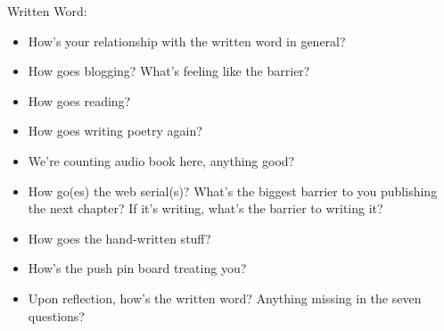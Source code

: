 
		\item Written Word:
		\begin{itemize}
			\item How's your relationship with the written word in general?

			\item How goes blogging? What's feeling like the barrier?

			\item How goes reading?

			\item How goes writing poetry again?

			\item We're counting audio book here, anything good?

			\item How go(es) the web serial(s)? What's the biggest barrier to you publishing the next chapter? If it's writing, what's the barrier to writing it?

			\item How goes the hand-written stuff?

			\item How's the push pin board treating you?

			\item Upon reflection, how's the written word? Anything missing in the seven questions?

		\end{itemize}
